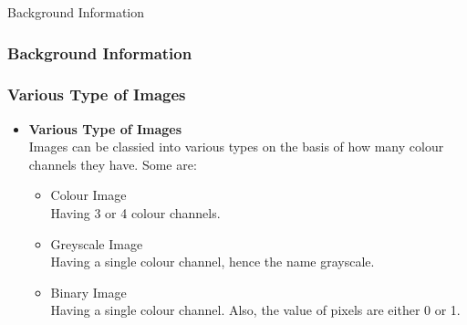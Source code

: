 \documentclass{beamer}
\begin{document}
\begin{frame}{Background Information}
    \frametitle{Background Information}
    \subsubsection{Various Type of Images}
    \begin{itemize}
        \item <1-> \textbf{Various Type of Images}\\
              Images can be classied into various types on the basis of how many colour channels they have. Some are:
              \begin{itemize}
                  \item <2-> Colour Image\\
                        Having 3 or 4 colour channels.
                  \item <3-> Greyscale Image\\
                        Having a single colour channel, hence the name grayscale.
                  \item <4-> Binary Image\\
                        Having a single colour channel. Also, the value of pixels are either 0 or 1.
              \end{itemize}
    \end{itemize}
\end{frame}
\end{document}
